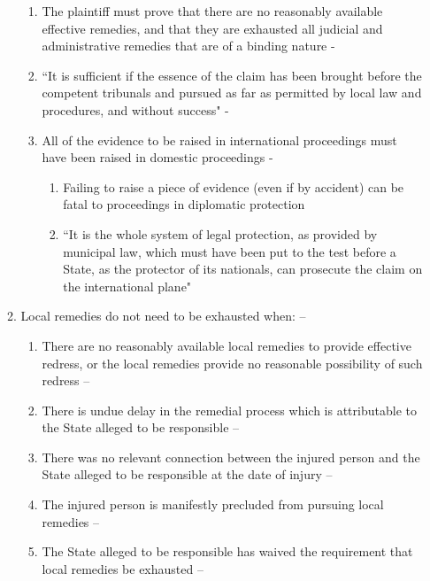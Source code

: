 \begin{enumerate}
\begin{enumerate}
\begin{enumerate}
            \item The plaintiff must prove that there are no reasonably available effective remedies, and that they are exhausted all judicial and administrative remedies that are of a binding nature - 
            \item ``It is sufficient if the essence of the claim has been brought before the competent tribunals and pursued as far as permitted by local law and procedures, and without success" - 
            \item All of the evidence to be raised in international proceedings must have been raised in domestic proceedings - 
            \begin{enumerate}
                \item Failing to raise a piece of evidence (even if by accident) can be fatal to proceedings in diplomatic protection
                \item ``It is the whole system of legal protection, as provided by municipal law, which must have been put to the test before a State, as the protector of its nationals, can prosecute the claim on the international plane"
            \end{enumerate}
        \end{enumerate}
        \item Local remedies do not need to be exhausted when: -- 
        \begin{enumerate}
            \item There are no reasonably available local remedies to provide effective redress, or the local remedies provide no reasonable possibility of such redress -- 
            \item There is undue delay in the remedial process which is attributable to the State alleged to be responsible -- 
            \item There was no relevant connection between the injured person and the State alleged to be responsible at the date of injury -- 
            \item The injured person is manifestly precluded from pursuing local remedies -- 
            \item The State alleged to be responsible has waived the requirement that local remedies be exhausted -- 
        \end{enumerate}
    \end{enumerate}
\end{enumerate}

